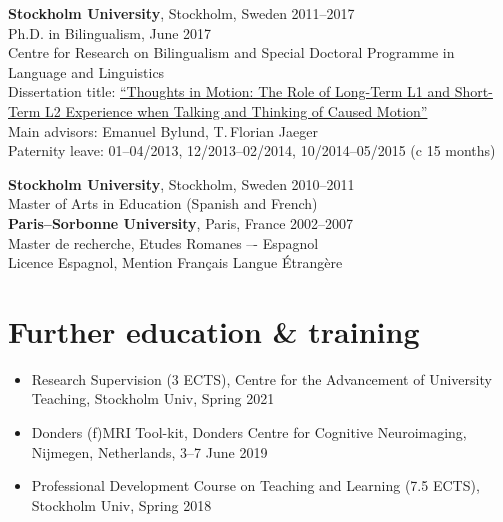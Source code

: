 \documentclass[margin, 11pt]{res} %
\begin{document}
\begin{resume}
{\bf Stockholm University}, Stockholm, Sweden \hfill 2011--2017\\
Ph.D. in Bilingualism, June 2017
\vspace*{.05in}\\
Centre for Research on Bilingualism and Special Doctoral Programme in Language and Linguistics
\vspace*{.05in}\\
Dissertation title:  \href{http://su.diva-portal.org/smash/record.jsf?pid=diva2:1092276}{``Thoughts in Motion: The Role of Long-Term L1 and Short-Term L2 Experience when Talking and Thinking of Caused Motion''}
\vspace*{.05in}\\
Main advisors:  Emanuel Bylund, T.\,Florian Jaeger
\vspace*{.05in}\\
\textcolor{mygray}{Paternity leave: 01--04/2013, 12/2013--02/2014, 10/2014--05/2015 (c 15 months)}

{\bf Stockholm University}, Stockholm, Sweden \hfill 2010--2011\\
Master of Arts in Education (Spanish and French)\\

\vspace*{-.1in}
{\bf Paris--Sorbonne University}, Paris, France \hfill 2002--2007\\
Master de recherche, Etudes Romanes –- Espagnol \\
Licence Espagnol, Mention Fran\c{c}ais Langue \'{E}trang\`{e}re \\
 

\section{\sc Further education \& training}

\begin{itemize}

\item Research Supervision (3 ECTS), Centre for the Advancement of University Teaching, Stockholm Univ, Spring 2021

\item Donders (f)MRI Tool-kit, Donders Centre for Cognitive Neuroimaging, Nijmegen, Netherlands, 3--7 June 2019

\item Professional Development Course on Teaching and Learning (7.5 ECTS), Stockholm Univ, Spring 2018


\end{itemize}
\end{resume}
\end{document}
